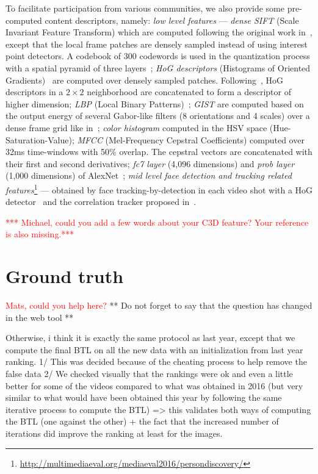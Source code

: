 \documentclass[sigconf]{acmart-me}
\begin{document}
To facilitate participation from various communities, we also
provide some pre-computed content descriptors, namely: \emph{low
level features} --- \emph{dense SIFT} (Scale Invariant Feature
Transform) which are computed following the original work
in~\cite{Lowe2004}, except that the local frame patches are densely
sampled instead of using interest point detectors. A codebook of 300
codewords is used in the quantization process with a spatial pyramid
of three layers~\cite{Lazebnik2006}; \emph{HoG descriptors}
(Histograms of Oriented Gradients)~\cite{Dalal2005} are computed
over densely sampled patches. Following~\cite{Xiao2010}, HoG
descriptors in a $2\times2$ neighborhood are concatenated to form a
descriptor of higher dimension; \emph{LBP} (Local Binary
Patterns)~\cite{Ojala2002}; \emph{GIST} are computed based on the
output energy of several Gabor-like filters (8 orientations and 4
scales) over a dense frame grid like in~\cite{Oliva2001};
\emph{color histogram} computed in the HSV space
(Hue-Saturation-Value); \emph{MFCC} (Mel-Frequency Cepstral
Coefficients) computed over 32ms time-windows with 50\%
overlap. The cepstral vectors are concatenated with their first and
second derivatives; \emph{fc7 layer} (4,096 dimensions) and
\emph{prob layer} (1,000 dimensions) of AlexNet~\cite{Jiang2015};
\emph{mid level face detection and tracking related
features}\footnote{\url{http://multimediaeval.org/mediaeval2016/persondiscovery/}}
--- obtained by face tracking-by-detection in each video shot with a
HoG detector~\cite{Dalal2005} and the correlation tracker proposed
in~\cite{Danelljan2014}.

\textcolor{red}{*** Michael, could you add a few words about your C3D feature? Your reference is also missing.***}


\section{Ground truth}

\textcolor{red}{Mats, could you help here?}
** Do not forget to say that the question has changed in the web tool **

Otherwise, i think it is exactly the same protocol as last year, except that we compute the final BTL on all the new data with an initialization from last year ranking. 1/ This was decided because of the cheating process to help remove the false data 2/ We checked visually that the rankings were ok and even a little better for some of the videos compared to what was obtained in 2016 (but very similar to what would have been obtained this year by following the same iterative process to compute the BTL) => this validates both ways of computing the BTL (one against the other) + the fact that the increased number of iterations did improve the ranking at least for the images.
  
\end{document}
